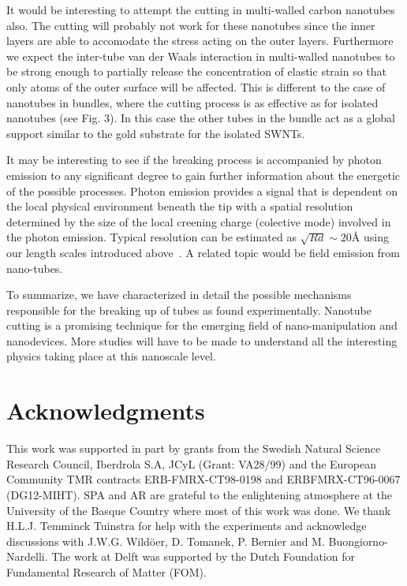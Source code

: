 \begin{multicols}{2}
It would be interesting to attempt the cutting in multi-walled
carbon nanotubes also. The cutting will probably not work for
these nanotubes since the inner layers are able to accomodate the
stress acting on the outer layers. Furthermore we expect the
inter-tube van der Waals interaction in multi-walled nanotubes to
be strong enough to partially release the concentration of
elastic strain so that only atoms of the outer surface will be
affected. This is different to the case of nanotubes in bundles,
where the cutting process is as effective as for isolated
nanotubes (see Fig. 3). In this case the other tubes in the bundle
act as a global support similar to the gold substrate for the
isolated SWNTs.

It may be interesting to see if the breaking process is
accompanied by photon emission to any significant degree to gain
further information about the energetic of the possible processes.
Photon emission provides a signal that is dependent on the local
physical environment beneath the tip with a spatial resolution
determined by the size of the local creening charge (colective
mode) involved in the photon emission. Typical resolution can be
estimated as $\sqrt{Rd} \sim 20${\AA} using our length scales
introduced above~\cite{Johansson,comment_field}. A related topic
would be field emission from nano-tubes.

To summarize, we have characterized in detail the possible
mechanisms responsible for the breaking up of tubes as found
experimentally. Nanotube cutting is a promising technique for the
emerging field of nano-manipulation and nanodevices. More studies
will have to be made to understand all the interesting physics
taking place at this nanoscale level.

\section*{Acknowledgments}

\indent This work was supported in part by grants from the Swedish
Natural Science Research Council, Iberdrola S.A, JCyL (Grant:
VA28/99) and the European Community TMR contracts
ERB-FMRX-CT98-0198 and ERBFMRX-CT96-0067 (DG12-MIHT). SPA and AR
are grateful to the enlightening atmosphere at the University of
the Basque Country where most of this work was done. We thank
H.L.J. Temminck Tuinstra for help with the experiments and
acknowledge discussions with J.W.G. Wild\"{o}er, D. Tomanek, P.
Bernier and M. Buongiorno-Nardelli. The work at Delft was
supported by the Dutch Foundation for Fundamental Research of
Matter (FOM).
\begin{thebibliography}{99}


\end{thebibliography}
\end{multicols}

